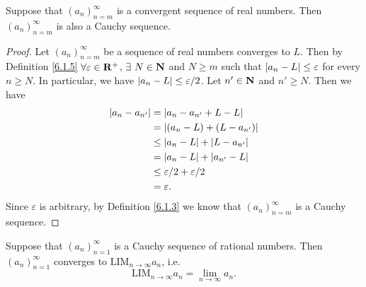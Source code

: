 \begin{proposition}\label{6.1.12}
    Suppose that \((a_n)_{n = m}^\infty\) is a convergent sequence of real numbers.
    Then \((a_n)_{n = m}^\infty\) is also a Cauchy sequence.
\end{proposition}

\begin{proof}
    Let \((a_n)_{n = m}^\infty\) be a sequence of real numbers converges to \(L\).
    Then by Definition \ref{6.1.5} \(\forall \varepsilon \in \mathbf{R}^+\), \(\exists\ N \in \mathbf{N}\) and \(N \geq m\) such that \(\left\lvert a_n - L\right\rvert \leq \varepsilon\) for every \(n \geq N\).
    In particular, we have \(\left\lvert a_n - L\right\rvert \leq \varepsilon / 2\).
    Let \(n' \in \mathbf{N}\) and \(n' \geq N\).
    Then we have
    \begin{align*}
        \left\lvert a_n - a_{n'}\right\rvert & = \left\lvert a_n - a_{n'} + L - L\right\rvert           \\
                           & = \left\lvert(a_n - L) + (L - a_{n'})\right\rvert       \\
                           & \leq \left\lvert a_n - L\right\rvert + \left\lvert L - a_{n'}\right\rvert  \\
                           & = \left\lvert a_n - L\right\rvert + \left\lvert a_{n'} - L\right\rvert     \\
                           & \leq \varepsilon / 2 + \varepsilon / 2 \\
                           & = \varepsilon.
    \end{align*}
    Since \(\varepsilon\) is arbitrary, by Definition \ref{6.1.3} we know that \((a_n)_{n = m}^\infty\) is a Cauchy sequence.
\end{proof}

\setcounter{theorem}{14}
\begin{proposition}\label{6.1.15}
    Suppose that \((a_n)_{n = 1}^\infty\) is a Cauchy sequence of rational numbers.
    Then \((a_n)_{n = 1}^\infty\) converges to \(\text{LIM}_{n \to \infty} a_n\), i.e.
    \[
        \text{LIM}_{n \to \infty} a_n = \lim_{n \to \infty} a_n.
    \]
\end{proposition}

